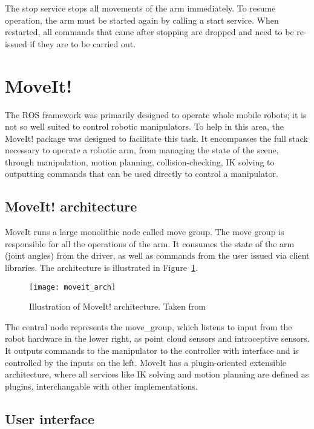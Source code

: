 \documentclass[buriama8_dp.tex]{subfiles}
\begin{document}
The stop service stops all movements of the arm immediately. To resume operation, the arm must be started again by calling a start service. When restarted, all commands that came after stopping are dropped and need to be re-issued if they are to be carried out.

\section{MoveIt!}
\label{sec:moveit}

The ROS framework was primarily designed to operate whole mobile robots; it is not so well suited to control robotic manipulators. To help in this area, the MoveIt! package \cite{moveit_docs} was designed to facilitate this task. It encompasses the full stack necessary to operate a robotic arm, from managing the state of the scene, through manipulation, motion planning, collision-checking, IK solving to outputting commands that can be used directly to control a manipulator.

\subsection{MoveIt! architecture}
\label{subsec:mvt_arch}

MoveIt runs a large monolithic node called move group. The move group is responsible for all the operations of the arm. It consumes the state of the arm (joint angles) from the driver, as well as commands from the user issued via client libraries. The architecture is illustrated in Figure~\ref{fig:moveit_arch}.

\begin{figure}[ht]
  \centering
  \texttt{[image: moveit\_arch]}
  \caption[MoveIt! architecture]{Illustration of MoveIt! architecture. Taken from \cite{moveit_docs}}
  \label{fig:moveit_arch}
\end{figure}

The central node represents the move\_group, which listens to input from the robot hardware in the lower right, as point cloud sensors and introceptive sensors. It outputs commands to the manipulator to the controller with  interface and is controlled by the inputs on the left. MoveIt has a plugin-oriented extensible architecture, where all services like IK solving and motion planning are defined as plugins, interchangable with other implementations.

\subsection{User interface}
\label{subsec:moveit_ui}
\end{document}

